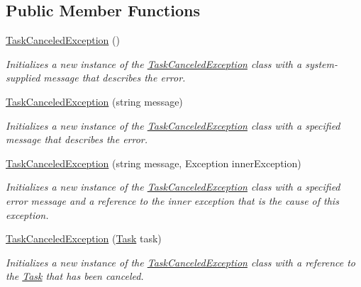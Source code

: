 \subsection*{Public Member Functions}
\begin{DoxyCompactItemize}
\item 
\hyperlink{class_system_1_1_threading_1_1_tasks_1_1_task_canceled_exception_a95540b7ffe4c452fb49979d083582fa1}{Task\+Canceled\+Exception} ()
\begin{DoxyCompactList}\small\item\em Initializes a new instance of the \hyperlink{class_system_1_1_threading_1_1_tasks_1_1_task_canceled_exception}{Task\+Canceled\+Exception} class with a system-\/supplied message that describes the error. \end{DoxyCompactList}\item 
\hyperlink{class_system_1_1_threading_1_1_tasks_1_1_task_canceled_exception_a89473ace42ab79852c5485a535b1e0ea}{Task\+Canceled\+Exception} (string message)
\begin{DoxyCompactList}\small\item\em Initializes a new instance of the \hyperlink{class_system_1_1_threading_1_1_tasks_1_1_task_canceled_exception}{Task\+Canceled\+Exception} class with a specified message that describes the error. \end{DoxyCompactList}\item 
\hyperlink{class_system_1_1_threading_1_1_tasks_1_1_task_canceled_exception_a3ec415bbbefdfe9c9e1ef2ebd4f5fc32}{Task\+Canceled\+Exception} (string message, Exception inner\+Exception)
\begin{DoxyCompactList}\small\item\em Initializes a new instance of the \hyperlink{class_system_1_1_threading_1_1_tasks_1_1_task_canceled_exception}{Task\+Canceled\+Exception} class with a specified error message and a reference to the inner exception that is the cause of this exception. \end{DoxyCompactList}\item 
\hyperlink{class_system_1_1_threading_1_1_tasks_1_1_task_canceled_exception_aa766c4047bb9529d6443a702fdd33041}{Task\+Canceled\+Exception} (\hyperlink{class_system_1_1_threading_1_1_tasks_1_1_task}{Task} task)
\begin{DoxyCompactList}\small\item\em Initializes a new instance of the \hyperlink{class_system_1_1_threading_1_1_tasks_1_1_task_canceled_exception}{Task\+Canceled\+Exception} class with a reference to the \hyperlink{class_system_1_1_threading_1_1_tasks_1_1_task}{Task} that has been canceled. \end{DoxyCompactList}\end{DoxyCompactItemize}


